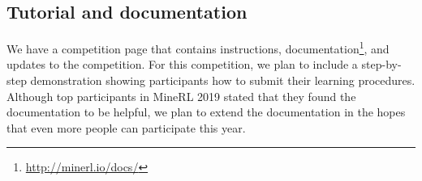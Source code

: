 \subsection{Tutorial and documentation}

We have a competition page that contains instructions, documentation\footnote{\url{http://minerl.io/docs/}}, and updates to the competition. 
For this competition, we plan to include a step-by-step demonstration showing participants how to submit their learning procedures.
Although top participants in MineRL 2019 stated that they found the documentation to be helpful, we plan to extend the documentation in the hopes that even more people can participate this year.